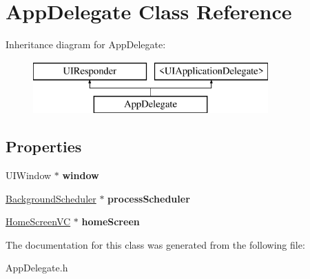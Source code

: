 \hypertarget{interface_app_delegate}{\section{App\-Delegate Class Reference}
\label{interface_app_delegate}
}
Inheritance diagram for App\-Delegate\-:\begin{figure}[H]
\begin{center}
\leavevmode
\includegraphics[height=2.000000cm]{interface_app_delegate}
\end{center}
\end{figure}
\subsection*{Properties}
\begin{DoxyCompactItemize}
\item 
\hypertarget{interface_app_delegate_acf48ac24125e688cac1a85445cd7fac2}{U\-I\-Window $\ast$ {\bfseries window}}\label{interface_app_delegate_acf48ac24125e688cac1a85445cd7fac2}

\item 
\hypertarget{interface_app_delegate_a7774bb6fd8b636a6d6b15f91f2809a91}{\hyperlink{interface_background_scheduler}{Background\-Scheduler} $\ast$ {\bfseries process\-Scheduler}}\label{interface_app_delegate_a7774bb6fd8b636a6d6b15f91f2809a91}

\item 
\hypertarget{interface_app_delegate_a22a5a481802e14bae7bd6cbffd141c65}{\hyperlink{interface_home_screen_v_c}{Home\-Screen\-V\-C} $\ast$ {\bfseries home\-Screen}}\label{interface_app_delegate_a22a5a481802e14bae7bd6cbffd141c65}

\end{DoxyCompactItemize}


The documentation for this class was generated from the following file\-:\begin{DoxyCompactItemize}
\item 
App\-Delegate.\-h\end{DoxyCompactItemize}
